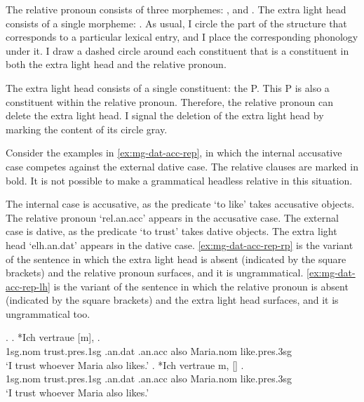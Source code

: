The relative pronoun consists of three morphemes: ,  and .
The extra light head consists of a single morpheme: .
As usual, I circle the part of the structure that corresponds to a particular lexical entry, and I place the corresponding phonology under it.
I draw a dashed circle around each constituent that is a constituent in both the extra light head and the relative pronoun.

The extra light head consists of a single constituent: the P.
This P is also a constituent within the relative pronoun. Therefore, the relative pronoun can delete the extra light head. I signal the deletion of the extra light head by marking the content of its circle gray.

Consider the examples in \ref{ex:mg-dat-acc-rep}, in which the internal accusative case competes against the external dative case. The relative clauses are marked in bold. It is not possible to make a grammatical headless relative in this situation.

The internal case is accusative, as the predicate  `to like' takes accusative objects. The relative pronoun  `\ac{rel}.\ac{an}.\ac{acc}' appears in the accusative case.
The external case is dative, as the predicate  `to trust' takes dative objects. The extra light head  `\ac{elh}.\ac{an}.\ac{dat}' appears in the dative case.
\ref{ex:mg-dat-acc-rep-rp} is the variant of the sentence in which the extra light head is absent (indicated by the square brackets) and the relative pronoun surfaces, and it is ungrammatical.
\ref{ex:mg-dat-acc-rep-lh} is the variant of the sentence in which the relative pronoun is absent (indicated by the square brackets) and the extra light head surfaces, and it is ungrammatical too.

\ex.\label{ex:mg-dat-acc-rep}
\ag. *Ich vertraue [m],    .\\
1\ac{sg}.\ac{nom} trust.\ac{pres}.1\ac{sg}\scsub{[dat]} .\ac{an}.\ac{dat} .\ac{an}.\ac{acc} also Maria.\ac{nom} like.\ac{pres}.3\ac{sg}\scsub{[acc]}\\
`I trust whoever Maria also likes.' \label{ex:mg-dat-acc-rep-rel}
\bg. *Ich vertraue m, []   .\\
1\ac{sg}.\ac{nom} trust.\ac{pres}.1\ac{sg}\scsub{[dat]} .\ac{an}.\ac{dat} .\ac{an}.\ac{acc} also Maria.\ac{nom} like.\ac{pres}.3\ac{sg}\scsub{[acc]}\\
`I trust whoever Maria also likes.' \label{ex:mg-dat-acc-rep-lh}

